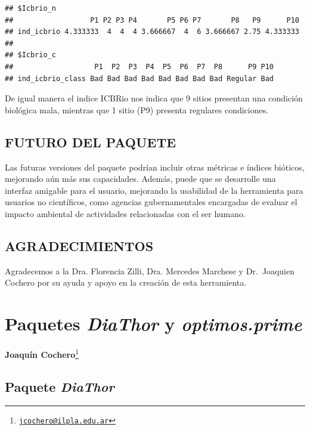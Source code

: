 \documentclass[
]{book}
\begin{document}
\begin{verbatim}
## $Icbrio_n
##                  P1 P2 P3 P4       P5 P6 P7       P8   P9      P10
## ind_icbrio 4.333333  4  4  4 3.666667  4  6 3.666667 2.75 4.333333
## 
## $Icbrio_c
##                   P1  P2  P3  P4  P5  P6  P7  P8      P9 P10
## ind_icbrio_class Bad Bad Bad Bad Bad Bad Bad Bad Regular Bad
\end{verbatim}

De igual manera el indice ICBRio nos indica que 9 sitios presentan una condición biológica mala, mientras que 1 sitio (P9) presenta regulares condiciones.

\hypertarget{futuro-del-paquete}{%
\section{FUTURO DEL PAQUETE}\label{futuro-del-paquete}}

Las futuras versiones del paquete podrían incluir otras métricas e índices bióticos, mejorando aún más sus capacidades.
Además, puede que se desarrolle una interfaz amigable para el usuario, mejorando la usabilidad de la herramienta para usuarios no científicos, como agencias gubernamentales encargadas de evaluar el impacto ambiental de actividades relacionadas con el ser humano.

\hypertarget{agradecimientos-1}{%
\section{AGRADECIMIENTOS}\label{agradecimientos-1}}

Agradecemos a la Dra.
Florencia Zilli, Dra.
Mercedes Marchese y Dr.~Joaquien Cochero por su ayuda y apoyo en la creación de esta herramienta.

\hypertarget{diathor}{%
\chapter{\texorpdfstring{Paquetes \emph{DiaThor} y \emph{optimos.prime}}{Paquetes DiaThor y optimos.prime}}\label{diathor}}

\textbf{Joaquín Cochero}\footnote{\href{mailto:jcochero@ilpla.edu.ar}{\nolinkurl{jcochero@ilpla.edu.ar}}}

\hypertarget{paquete-diathor}{%
\section{\texorpdfstring{Paquete \emph{DiaThor}}{Paquete DiaThor}}\label{paquete-diathor}}
\end{document}
